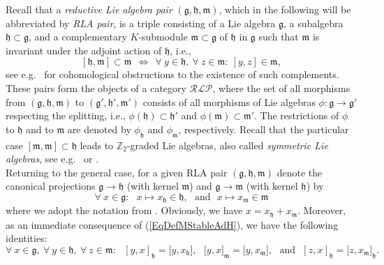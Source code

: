 \documentclass [11pt] {article}
\theoremstyle{definition}
\begin{document}
Recall that a 
 \textit{reductive Lie algebra pair} $(\mathfrak{g},\mathfrak{h},\mathfrak{m})$,
 which in the following will be abbreviated by \textit{RLA pair}, is a triple consisting of a Lie algebra
$\mathfrak{g}$, a subalgebra $\mathfrak{h}\subset \mathfrak{g}$, and a complementary $K$-submodule $\mathfrak{m}\subset \mathfrak{g}$ of $\mathfrak{h}$
in $\mathfrak{g}$
such that $\mathfrak{m}$ is invariant under the adjoint action
of $\mathfrak{h}$, i.e.,
\begin{equation}\label{EqDefMStableAdH}
  [\mathfrak{h},\mathfrak{m}]\subset \mathfrak{m}
  ~~\Longleftrightarrow~~
  \forall~y\in\mathfrak{h},~\forall~z\in \mathfrak{m}:~
     [y,z]\in \mathfrak{m},
\end{equation}
see e.g.~\cite{NVH65} for cohomological obstructions to the existence of such complements. These pairs form the objects of a category
$\mathcal{RLP}$, where the set of all morphisms from
$(\mathfrak{g},\mathfrak{h},\mathfrak{m})$ to
$(\mathfrak{g}',\mathfrak{h}',\mathfrak{m}')$ consists
of all morphisms of Lie algebras $\phi:\mathfrak{g}\to
\mathfrak{g}'$ respecting the splitting, i.e.,
$\phi(\mathfrak{h})\subset \mathfrak{h}'$ and
$\phi(\mathfrak{m})\subset \mathfrak{m}'$. The restrictions of $\phi$ to $\mathfrak{h}$ and to $\mathfrak{m}$ are denoted by $\phi_\mathfrak{h}$ and
$\phi_\mathfrak{m}$, respectively. 
Recall that the particular case $[\mathfrak{m},\mathfrak{m}]\subset\mathfrak{h}$
leads to $\mathbb{Z}_2$-graded Lie algebras, also called
\textit{symmetric Lie algebras}, see e.g.~\cite[p.~225]{KN69}
or \cite{Hel78}.\\
Returning to the general case,
for a given RLA pair $(\mathfrak{g},\mathfrak{h},\mathfrak{m})$ denote the canonical projections $\mathfrak{g}\to \mathfrak{h}$
(with kernel $\mathfrak{m}$) and 
$\mathfrak{g}\to \mathfrak{m}$
(with kernel $\mathfrak{h}$) by
\begin{equation}
  \forall~x\in \mathfrak{g}:~~~x\mapsto x_\mathfrak{h}\in\mathfrak{h},~~~
   \mathrm{and}~~~
   x\mapsto x_\mathfrak{m}\in\mathfrak{m}
\end{equation}
where we adopt the notation from \cite[p.~191]{KN69}.
Obviously, we have $x=x_\mathfrak{h}+x_\mathfrak{m}$. Moreover, as an immediate consequence of (\ref{EqDefMStableAdH}), we have the following identities:
\begin{equation}\label{EqDefRLAadHpreservesHAndM}
 \forall~x\in \mathfrak{g},~\forall~y\in \mathfrak{h},~\forall~z\in \mathfrak{m}
   : ~~~[y,x]_\mathfrak{h}=
          \big[y,x_\mathfrak{h}\big],~~~ 
          \big[y,x\big]_\mathfrak{m}=
          \big[y,x_\mathfrak{m}\big],~~~\mathrm{and}~~~
          [z,x]_\mathfrak{h}=
          \big[z,x_\mathfrak{m}\big]_\mathfrak{h} .
   \end{equation}
\end{document}
